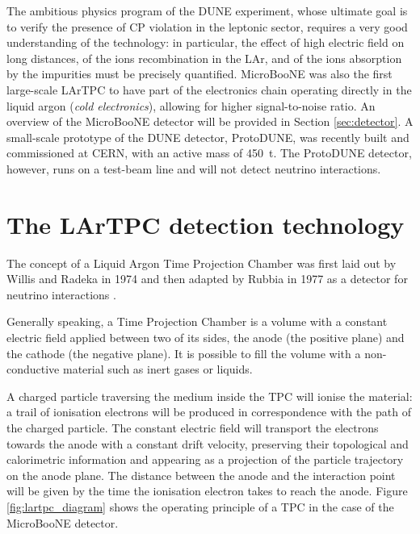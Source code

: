 The ambitious physics program of the DUNE experiment, whose ultimate goal is to verify the presence of CP violation in the leptonic sector, requires a very good understanding of the technology: in particular, the effect of high electric field on long distances, of the ions recombination in the LAr, and of the ions absorption by the impurities must be precisely quantified. 
MicroBooNE was also the first large-scale LArTPC to have part of the electronics chain operating directly in the liquid argon (\emph{cold electronics}), allowing for higher signal-to-noise ratio. An overview of the MicroBooNE detector will be provided in Section \ref{sec:detector}.
A small-scale prototype of the DUNE detector, ProtoDUNE, was recently built and commissioned at CERN, with an active mass of 450~t. The ProtoDUNE detector, however, runs on a test-beam line and will not detect neutrino interactions.

\section{The LArTPC detection technology}
The concept of a Liquid Argon Time Projection Chamber was first laid out by Willis and Radeka in 1974 \cite{Willis:1974gi} and then adapted by Rubbia in 1977 as a detector for neutrino interactions \cite{Rubbia:1977zz}. 

Generally speaking, a Time Projection Chamber is a volume with a constant electric field applied between two of its sides, the anode (the positive plane) and the cathode (the negative plane). It is possible to fill the volume with a non-conductive material such as inert gases or liquids. %

A charged particle traversing the medium inside the TPC will ionise the material: a trail of ionisation electrons will be produced in correspondence with the path of the charged particle. The constant electric field will transport the electrons towards the anode with a constant drift velocity, preserving their topological and calorimetric information and appearing as a projection of the particle trajectory on the anode plane. The distance between the anode and the interaction point will be given by the time the ionisation electron takes to reach the anode. Figure \ref{fig:lartpc_diagram} shows the operating principle of a TPC in the case of the MicroBooNE detector. 

